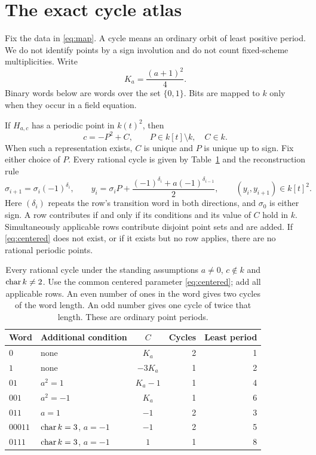 \section{The exact cycle atlas}\label{sec:atlas}
Fix the data in \eqref{eq:map}. A cycle means an ordinary orbit of
least positive period. We do not identify points by a sign involution
and do not count fixed-scheme multiplicities. Write
\[
 K_a=\frac{(a+1)^2}{4}.
\]
Binary words below are words over the set $\{0,1\}$. Bits are mapped
to $k$ only when they occur in a field equation.

\begin{theorem}\label{thm:atlas}
If $H_{a,c}$ has a periodic point in $k(t)^2$, then
\begin{equation}\label{eq:centered}
 c=-P^2+C,\qquad P\in k[t]\setminus k,\quad C\in k.
\end{equation}
When such a representation exists, $C$ is unique and $P$ is unique
up to sign. Fix either choice of $P$. Every rational cycle is given
by Table~\ref{tab:atlas} and the reconstruction rule
\begin{equation}\label{eq:word-reconstruction}
 \sigma_{i+1}=\sigma_i(-1)^{\delta_i},\qquad
 y_i=\sigma_iP+
 \frac{(-1)^{\delta_i}+a(-1)^{\delta_{i-1}}}{2},
 \qquad (y_i,y_{i+1})\in k[t]^2.
\end{equation}
Here $(\delta_i)$ repeats the row's transition word in both directions,
and $\sigma_0$ is either sign. A row contributes if and only if its
conditions and its value of $C$ hold in $k$. Simultaneously applicable
rows contribute disjoint point sets and are added. If
\eqref{eq:centered} does not exist, or if it exists but no row applies,
there are no rational periodic points.
\end{theorem}

\begin{table}[htbp]
\centering
\small
\begin{tabular}{@{}llcrr@{}}
\toprule
Word & Additional condition & $C$ & Cycles & Least period\\
\midrule
$0$ & none & $K_a$ & 2 & 1\\
$1$ & none & $-3K_a$ & 1 & 2\\
$01$ & $a^2=1$ & $K_a-1$ & 1 & 4\\
$001$ & $a^2=-1$ & $K_a$ & 1 & 6\\
$011$ & $a=1$ & $-1$ & 2 & 3\\
$00011$ & $\operatorname{char} k=3$, $a=-1$ & $-1$ & 2 & 5\\
$0111$ & $\operatorname{char} k=3$, $a=-1$ & $1$ & 1 & 8\\
\bottomrule
\end{tabular}
\caption{Every rational cycle under the standing assumptions
$a\ne0$, $c\notin k$ and $\operatorname{char} k\ne2$. Use the common centered
parameter \eqref{eq:centered}; add all applicable rows. An even number
of ones in the word gives two cycles of the word length. An odd number
gives one cycle of twice that length. These are ordinary point periods.}
\label{tab:atlas}
\end{table}


